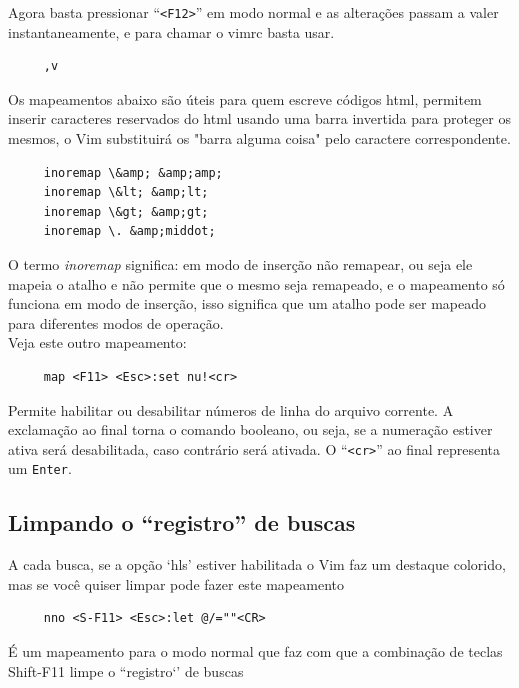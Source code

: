 \documentclass[10pt,a4paper,openany]{book}
\begin{document}
Agora basta pressionar ``\verb|<F12>|'' em modo normal e as alterações passam a valer
instantaneamente, e para chamar o vimrc basta usar.

\begin{verbatim}
     ,v
\end{verbatim}



Os mapeamentos abaixo são úteis
para quem escreve códigos html, permitem inserir caracteres reservados do html
usando uma barra invertida para proteger os mesmos, o Vim substituirá os "barra
alguma coisa" pelo caractere correspondente.

\begin{verbatim}
     inoremap \&amp; &amp;amp;
     inoremap \&lt; &amp;lt;
     inoremap \&gt; &amp;gt;
     inoremap \. &amp;middot;
\end{verbatim}

O termo {\em inoremap} significa: em modo de inserção não remapear, ou seja
ele mapeia o atalho e não permite que o mesmo seja remapeado, e o
mapeamento só funciona em modo de inserção, isso significa que um atalho
pode ser mapeado para diferentes modos de operação. \\


Veja este outro mapeamento:

\begin{verbatim}
     map <F11> <Esc>:set nu!<cr>
\end{verbatim}

Permite habilitar ou desabilitar números de linha do arquivo corrente.
A exclamação ao final torna o comando booleano, ou seja, se a
numeração estiver ativa será desabilitada, caso contrário será
ativada. O ``\verb|<cr>|'' ao final representa um {\tt Enter}.

\subsection{Limpando o ``registro'' de buscas}\label{Limpando o ``registro'' de buscas}

A cada busca, se a opção `hls' estiver habilitada o Vim faz um
destaque colorido, mas se você quiser limpar pode fazer este
mapeamento

\begin{verbatim}
     nno <S-F11> <Esc>:let @/=""<CR>
\end{verbatim}

É um mapeamento para o modo normal que faz com que a combinação de
teclas Shift-F11 limpe o ``registro`' de buscas
\end{document}
